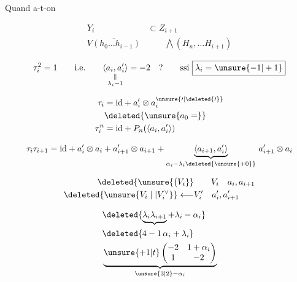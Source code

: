 
Quand a-t-on

\[
\begin{aligned}
Y_i&\subset Z_{i+1}\\
\overline{V(h_0\ldots h_{i-1})}&\qquad\bigwedge(H_n,\ldots H_{i+1})
\end{aligned}
\]

\[
\tau_i^2=1\qquad\text{i.e.}\qquad
\underset{\substack{\Vert\\\lambda_i-1}}{\langle a_i,a'_i\rangle}=-2\quad ?\qquad
\text{ssi }\boxed{\lambda_i=\unsure{-1|+1}}
\]

\[
\begin{aligned}
\tau_i&=\mathrm{id}+a'_i\otimes a^{\unsure{\prime|\deleted{\prime}}}_i\\
&\deleted{\unsure{a_0=}}\\
\tau_i^n&=\mathrm{id}+P_n(\langle a_i,a'_i\rangle)
\end{aligned}
\]

\[
\tau_i\tau_{i+1}=\mathrm{id}+a'_i\otimes a_i+a'_{i+1}\otimes a_{i+1}
 +\underbrace{\langle a_{i+1},a'_i\rangle}_{\alpha_i-\lambda_i\deleted{\unsure{+0}}}\,a'_{i+1}\otimes a_i
\]

\[
\begin{aligned}
\deleted{\unsure{\bigl( V_i}}&\qquad V_i\quad a_i,a_{i+1}\\
\deleted{\unsure{V_i\mid|V_i^\vee}}\longleftarrow &V'_i\quad a'_i,a'_{i+1}
\end{aligned}
\]


\[
\begin{aligned}
&\deleted{\underbrace{\lambda_i\lambda_{i+1}}+\lambda_i-\alpha_i}\\
&\deleted{4-1\,\alpha_i+\lambda_i}\\
&\underbrace{\unsure{+1|t}\begin{pmatrix}-2&1+\alpha_i\\1&-2\end{pmatrix}}_{\unsure{3|2}-\alpha_i}
\end{aligned}
\]

